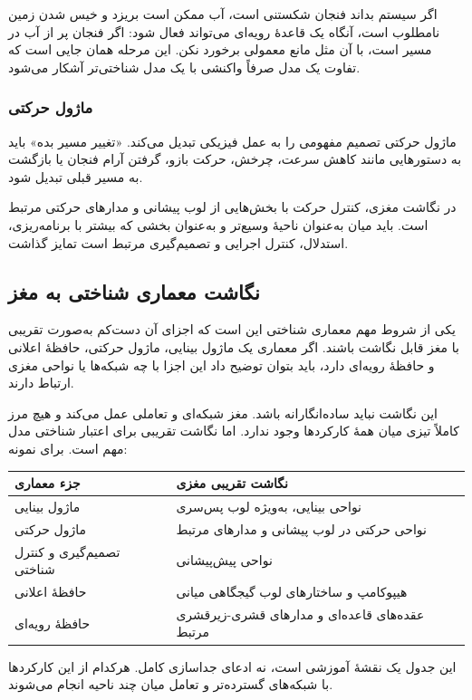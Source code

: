 اگر سیستم بداند فنجان شکستنی است، آب ممکن است بریزد و خیس شدن زمین نامطلوب است، آنگاه یک قاعدهٔ رویه‌ای می‌تواند فعال شود: اگر فنجان پر از آب در مسیر است، با آن مثل مانع معمولی برخورد نکن. این مرحله همان جایی است که تفاوت یک مدل صرفاً واکنشی با یک مدل شناختی‌تر آشکار می‌شود.

\subsubsection{ماژول حرکتی}
ماژول حرکتی تصمیم مفهومی را به عمل فیزیکی تبدیل می‌کند. «تغییر مسیر بده» باید به دستورهایی مانند کاهش سرعت، چرخش، حرکت بازو، گرفتن آرام فنجان یا بازگشت به مسیر قبلی تبدیل شود.

در نگاشت مغزی، کنترل حرکت با بخش‌هایی از لوب پیشانی و مدارهای حرکتی مرتبط است. باید میان  به‌عنوان ناحیهٔ وسیع‌تر و  به‌عنوان بخشی که بیشتر با برنامه‌ریزی، استدلال، کنترل اجرایی و تصمیم‌گیری مرتبط است تمایز گذاشت.

\subsection{نگاشت معماری شناختی به مغز}
یکی از شروط مهم معماری شناختی این است که اجزای آن دست‌کم به‌صورت تقریبی با مغز قابل نگاشت باشند. اگر معماری یک ماژول بینایی، ماژول حرکتی، حافظهٔ اعلانی و حافظهٔ رویه‌ای دارد، باید بتوان توضیح داد این اجزا با چه شبکه‌ها یا نواحی مغزی ارتباط دارند.

این نگاشت نباید ساده‌انگارانه باشد. مغز شبکه‌ای و تعاملی عمل می‌کند و هیچ مرز کاملاً تیزی میان همهٔ کارکردها وجود ندارد. اما نگاشت تقریبی برای اعتبار شناختی مدل مهم است. برای نمونه:
\begin{longtable}{>{\raggedleft\arraybackslash}p{}p{}}
\toprule
\textbf{جزء معماری} & \textbf{نگاشت تقریبی مغزی} \\
\midrule
ماژول بینایی & نواحی بینایی، به‌ویژه لوب پس‌سری \\
ماژول حرکتی & نواحی حرکتی در لوب پیشانی و مدارهای مرتبط \\
تصمیم‌گیری و کنترل شناختی & نواحی پیش‌پیشانی \\
حافظهٔ اعلانی & هیپوکامپ و ساختارهای لوب گیجگاهی میانی \\
حافظهٔ رویه‌ای & عقده‌های قاعده‌ای و مدارهای قشری-زیرقشری مرتبط \\
\bottomrule
\end{longtable}

این جدول یک نقشهٔ آموزشی است، نه ادعای جداسازی کامل. هرکدام از این کارکردها با شبکه‌های گسترده‌تر و تعامل میان چند ناحیه انجام می‌شوند.

